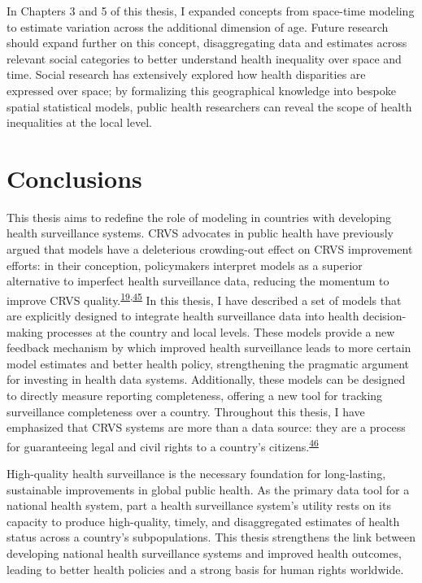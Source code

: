 \documentclass[
]{article}
\begin{document}
In Chapters 3 and 5 of this thesis, I expanded concepts from space-time modeling to estimate variation across the additional dimension of age. Future research should expand further on this concept, disaggregating data and estimates across relevant social categories to better understand health inequality over space and time. Social research has extensively explored how health disparities are expressed over space; by formalizing this geographical knowledge into bespoke spatial statistical models, public health researchers can reveal the scope of health inequalities at the local level.

\hypertarget{conclusions}{%
\section{Conclusions}\label{conclusions}}

This thesis aims to redefine the role of modeling in countries with developing health surveillance systems. CRVS advocates in public health have previously argued that models have a deleterious crowding-out effect on CRVS improvement efforts: in their conception, policymakers interpret models as a superior alternative to imperfect health surveillance data, reducing the momentum to improve CRVS quality.\textsuperscript{\protect\hyperlink{ref-Setel2007}{19},\protect\hyperlink{ref-Tichenor2020}{45}} In this thesis, I have described a set of models that are explicitly designed to integrate health surveillance data into health decision-making processes at the country and local levels. These models provide a new feedback mechanism by which improved health surveillance leads to more certain model estimates and better health policy, strengthening the pragmatic argument for investing in health data systems. Additionally, these models can be designed to directly measure reporting completeness, offering a new tool for tracking surveillance completeness over a country. Throughout this thesis, I have emphasized that CRVS systems are more than a data source: they are a process for guaranteeing legal and civil rights to a country's citizens.\textsuperscript{\protect\hyperlink{ref-AbouZahr2015}{46}}

High-quality health surveillance is the necessary foundation for long-lasting, sustainable improvements in global public health. As the primary data tool for a national health system, part a health surveillance system's utility rests on its capacity to produce high-quality, timely, and disaggregated estimates of health status across a country's subpopulations. This thesis strengthens the link between developing national health surveillance systems and improved health outcomes, leading to better health policies and a strong basis for human rights worldwide.
\end{document}

